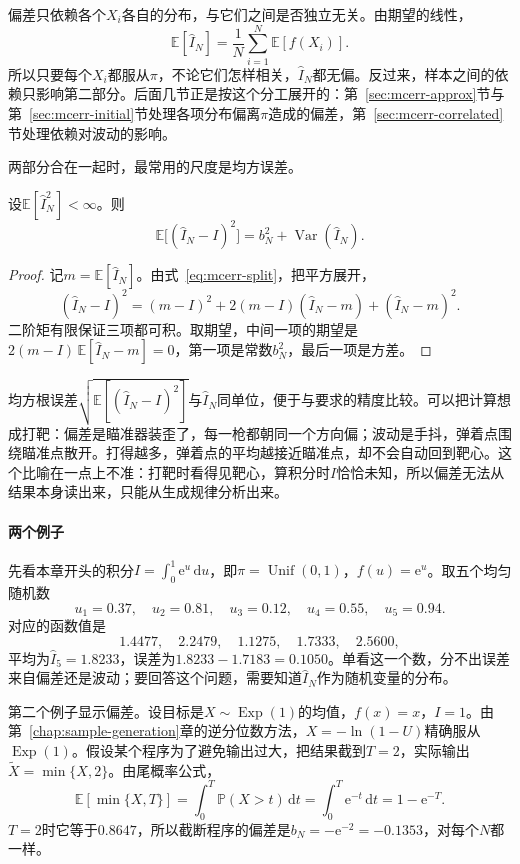 偏差只依赖各个$X_i$各自的分布，与它们之间是否独立无关。由期望的线性，
\[
 \mathbb{E}[\hat{I}_N]=\frac1N\sum_{i=1}^{N}\mathbb{E}[f(X_i)] .
\]
所以只要每个$X_i$都服从$\pi$，不论它们怎样相关，$\hat{I}_N$都无偏。反过来，样本之间的依赖只影响第二部分。后面几节正是按这个分工展开的：第~\ref{sec:mcerr-approx}节与第~\ref{sec:mcerr-initial}节处理各项分布偏离$\pi$造成的偏差，第~\ref{sec:mcerr-correlated}节处理依赖对波动的影响。

两部分合在一起时，最常用的尺度是均方误差。

\begin{theorem}[均方误差的分解]
\label{thm:mcerr-mse}
设$\mathbb{E}[\hat{I}_N^{2}]<\infty$。则
\begin{equation}
 \mathbb{E}\bigl[(\hat{I}_N-I)^{2}\bigr]=b_N^{2}+\operatorname{Var}(\hat{I}_N) .
 \label{eq:mcerr-mse}
\end{equation}
\end{theorem}

\begin{proof}
记$m=\mathbb{E}[\hat{I}_N]$。由式~\eqref{eq:mcerr-split}，把平方展开，
\[
 (\hat{I}_N-I)^{2}=(m-I)^{2}+2(m-I)(\hat{I}_N-m)+(\hat{I}_N-m)^{2} .
\]
二阶矩有限保证三项都可积。取期望，中间一项的期望是$2(m-I)\,\mathbb{E}[\hat{I}_N-m]=0$，第一项是常数$b_N^{2}$，最后一项是方差。
\end{proof}

均方根误差$\sqrt{\mathbb{E}[(\hat{I}_N-I)^{2}]}$与$\hat{I}_N$同单位，便于与要求的精度比较。可以把计算想成打靶：偏差是瞄准器装歪了，每一枪都朝同一个方向偏；波动是手抖，弹着点围绕瞄准点散开。打得越多，弹着点的平均越接近瞄准点，却不会自动回到靶心。这个比喻在一点上不准：打靶时看得见靶心，算积分时$I$恰恰未知，所以偏差无法从结果本身读出来，只能从生成规律分析出来。

\paragraph{两个例子}
先看本章开头的积分$I=\int_0^1\mathrm{e}^{u}\,\mathrm{d}u$，即$\pi=\operatorname{Unif}(0,1)$，$f(u)=\mathrm{e}^{u}$。取五个均匀随机数
\[
 u_1=0.37,\quad u_2=0.81,\quad u_3=0.12,\quad u_4=0.55,\quad u_5=0.94 .
\]
对应的函数值是
\[
 1.4477,\quad 2.2479,\quad 1.1275,\quad 1.7333,\quad 2.5600 ,
\]
平均为$\hat{I}_5=1.8233$，误差为$1.8233-1.7183=0.1050$。单看这一个数，分不出误差来自偏差还是波动；要回答这个问题，需要知道$\hat{I}_N$作为随机变量的分布。

第二个例子显示偏差。设目标是$X\sim\operatorname{Exp}(1)$的均值，$f(x)=x$，$I=1$。由第~\ref{chap:sample-generation}章的逆分位数方法，$X=-\ln(1-U)$精确服从$\operatorname{Exp}(1)$。假设某个程序为了避免输出过大，把结果截到$T=2$，实际输出$\tilde{X}=\min\{X,2\}$。由尾概率公式，
\[
 \mathbb{E}[\min\{X,T\}]=\int_0^{T}\mathbb{P}(X>t)\,\mathrm{d}t=\int_0^{T}\mathrm{e}^{-t}\,\mathrm{d}t=1-\mathrm{e}^{-T} .
\]
$T=2$时它等于$0.8647$，所以截断程序的偏差是$b_N=-\mathrm{e}^{-2}=-0.1353$，对每个$N$都一样。

